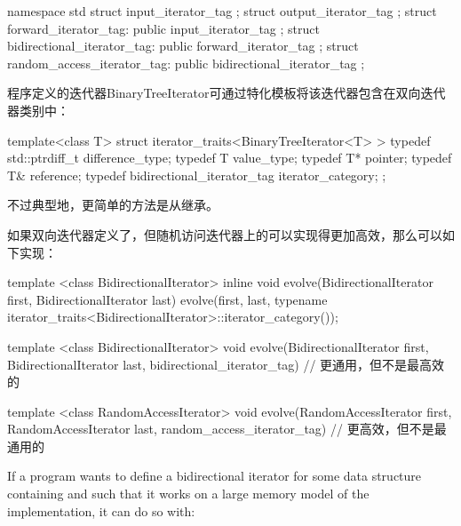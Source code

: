\begin{codeblock}
namespace std {
  struct input_iterator_tag { };
  struct output_iterator_tag { };
  struct forward_iterator_tag: public input_iterator_tag { };
  struct bidirectional_iterator_tag: public forward_iterator_tag { };
  struct random_access_iterator_tag: public bidirectional_iterator_tag { };
}
\end{codeblock}

\pnum
{}%
%
%
%
%
%
\enterexample
程序定义的迭代器{BinaryTreeIterator}可通过特化模板将该迭代器包含在双向迭代器类别中：

\begin{codeblock}
template<class T> struct iterator_traits<BinaryTreeIterator<T> > {
  typedef std::ptrdiff_t difference_type;
  typedef T value_type;
  typedef T* pointer;
  typedef T& reference;
  typedef bidirectional_iterator_tag iterator_category;
};
\end{codeblock}

不过典型地，更简单的方法是从继承。
\exitexample

\pnum
\enterexample
如果双向迭代器定义了，但随机访问迭代器上的可以实现得更加高效，那么可以如下实现：

\begin{codeblock}
template <class BidirectionalIterator>
inline void
evolve(BidirectionalIterator first, BidirectionalIterator last) {
  evolve(first, last,
    typename iterator_traits<BidirectionalIterator>::iterator_category());
}

template <class BidirectionalIterator>
void evolve(BidirectionalIterator first, BidirectionalIterator last,
  bidirectional_iterator_tag) {
  // 更通用，但不是最高效的
}

template <class RandomAccessIterator>
void evolve(RandomAccessIterator first, RandomAccessIterator last,
  random_access_iterator_tag) {
  // 更高效，但不是最通用的
}
\end{codeblock}
\exitexample

\pnum
\enterexample
If a \Cpp program wants to define a bidirectional iterator for some data structure containing
and such that it
works on a large memory model of the implementation, it can do so with:

